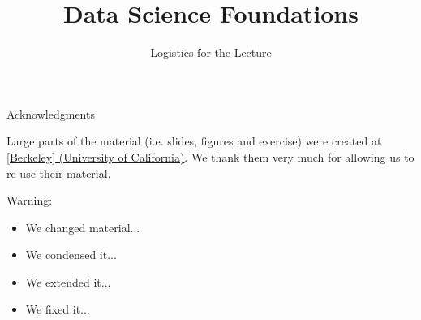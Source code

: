 \documentclass[aspectratio=169]{../latex_main/tntbeamer}  %
\title[Introduction]{Data Science Foundations}
\subtitle{Logistics for the Lecture}
\begin{document}
	
	\maketitle

\begin{frame}[c]{Acknowledgments}

Large parts of the material (i.e. slides, figures and exercise) were created at \href{https://ds100.org/}{[Berkeley] (University of California)}. We thank them very much for allowing us to re-use their material.

\bigskip

\alert{Warning}:
\begin{itemize}
    \item We changed material...
    \item We condensed it...
    \item We extended it...
    \item We fixed it...
\end{itemize}


\end{frame}
\end{document}
